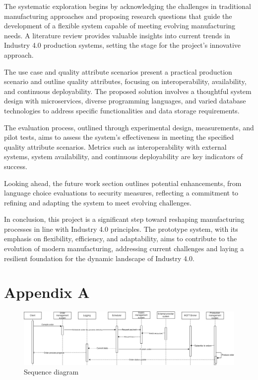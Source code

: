 \documentclass[conference]{IEEEtran}
\begin{document}
The systematic exploration begins by acknowledging the challenges in traditional manufacturing approaches and proposing research questions that guide the development of a flexible system capable of meeting evolving manufacturing needs. A literature review provides valuable insights into current trends in Industry 4.0 production systems, setting the stage for the project's innovative approach.

The use case and quality attribute scenarios present a practical production scenario and outline quality attributes, focusing on interoperability, availability, and continuous deployability. The proposed solution involves a thoughtful system design with microservices, diverse programming languages, and varied database technologies to address specific functionalities and data storage requirements.

The evaluation process, outlined through experimental design, measurements, and pilot tests, aims to assess the system's effectiveness in meeting the specified quality attribute scenarios. Metrics such as interoperability with external systems, system availability, and continuous deployability are key indicators of success.

Looking ahead, the future work section outlines potential enhancements, from language choice evaluations to security measures, reflecting a commitment to refining and adapting the system to meet evolving challenges.

In conclusion, this project is a significant step toward reshaping manufacturing processes in line with Industry 4.0 principles. The prototype system, with its emphasis on flexibility, efficiency, and adaptability, aims to contribute to the evolution of modern manufacturing, addressing current challenges and laying a resilient foundation for the dynamic landscape of Industry 4.0.




\section{Appendix A}

\begin{figure}[H]
    \centering
    \includegraphics[width=1\linewidth]{diagrams/sequence-diagram.png}
    \caption{Sequence diagram}
    \label{fig:sequence-diagram}
\end{figure}
\end{document}
